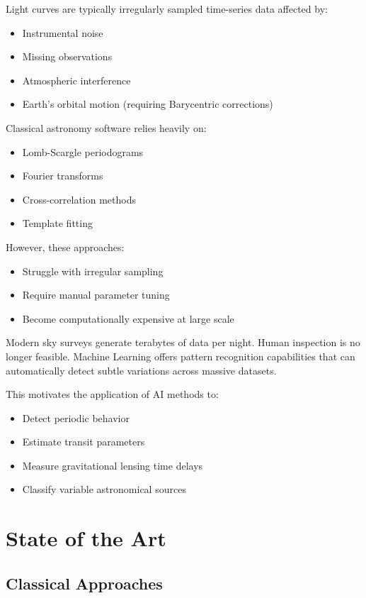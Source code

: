 \documentclass[12pt]{article}
\begin{document}
Light curves are typically irregularly sampled time-series data affected by:
\begin{itemize}
    \item Instrumental noise
    \item Missing observations
    \item Atmospheric interference
    \item Earth's orbital motion (requiring Barycentric corrections)
\end{itemize}

Classical astronomy software relies heavily on:
\begin{itemize}
    \item Lomb-Scargle periodograms
    \item Fourier transforms
    \item Cross-correlation methods
    \item Template fitting
\end{itemize}

However, these approaches:
\begin{itemize}
    \item Struggle with irregular sampling
    \item Require manual parameter tuning
    \item Become computationally expensive at large scale
\end{itemize}

Modern sky surveys generate terabytes of data per night. Human inspection is no longer feasible. Machine Learning offers pattern recognition capabilities that can automatically detect subtle variations across massive datasets.

This motivates the application of AI methods to:
\begin{itemize}
    \item Detect periodic behavior
    \item Estimate transit parameters
    \item Measure gravitational lensing time delays
    \item Classify variable astronomical sources
\end{itemize}

\section{State of the Art}

\subsection{Classical Approaches}
\end{document}
